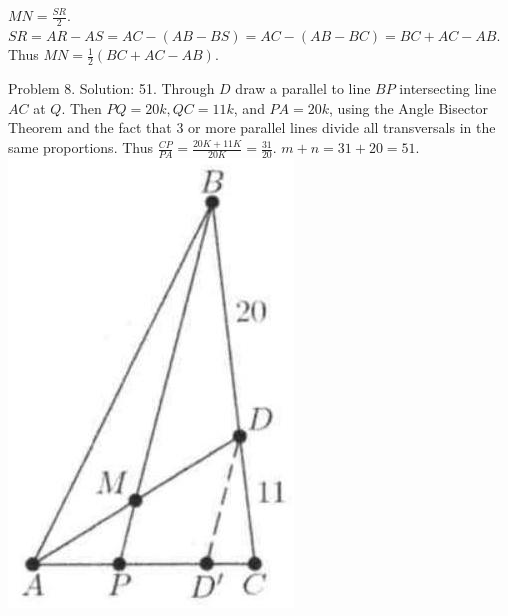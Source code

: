\documentclass[10pt]{article}
\begin{document}
\(M N=\frac{S R}{2}\).\\
\(S R=A R-A S=A C-(A B-B S)=A C-(A B-B C)=B C+A C-A B\).\\
Thus \(M N=\frac{1}{2}(B C+A C-A B)\).

Problem 8. Solution: 51.
Through \(D\) draw a parallel to line \(B P\) intersecting line \(A C\) at \(Q\). Then \(P Q=20 k, Q C=11 k\), and \(P A=20 k\), using the Angle Bisector Theorem and the fact that 3 or more parallel lines divide all transversals in the same proportions. Thus \(\frac{C P}{P A}=\frac{20 K+11 K}{20 K}=\frac{31}{20}\). \(m+n=31+20=51\).\\
\includegraphics[max width=\textwidth, center]{2025_04_17_97bc1f7e44d93c271a88g-070}
\end{document}
